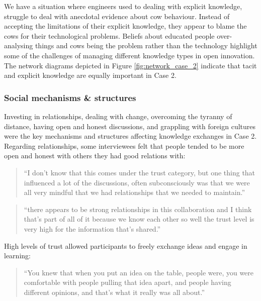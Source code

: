We have a situation where engineers used to dealing with explicit knowledge, struggle to deal with anecdotal evidence about cow behaviour. Instead of accepting the limitations of their explicit knowledge, they appear to blame the cows for their technological problems. Beliefs about educated people over-analysing things and cows being the problem rather than the technology highlight some of the challenges of managing different knowledge types in open innovation. The network diagrams depicted in Figure \ref{fig:network_case_2} indicate that tacit and explicit knowledge are equally important in Case 2. 
 
\subsubsection{Social mechanisms \& structures}

Investing in relationships, dealing with change, overcoming the tyranny of distance, having open and honest discussions, and grappling with foreign cultures were the key mechanisms and structures affecting knowledge exchanges in Case 2. Regarding relationships, some interviewees felt that people tended to be more open and honest with others they had good relations with:

\begin{quote}
\small
\enquote{I don't know that this comes under the trust category, but one thing that influenced a lot of the discussions, often subconsciously was that we were all very mindful that we had relationships that we needed to maintain.} \\
\end{quote}

\begin{quote}
\small
\enquote{there appears to be strong relationships in this collaboration and I think that's part of all of it because we know each other so well the trust level is very high for the information that's shared.} \\
\end{quote}

High levels of trust allowed participants to freely exchange ideas and engage in learning: 

\begin{quote}
\small
\enquote{You knew that when you put an idea on the table, people were, you were comfortable with people pulling that idea apart, and people having different opinions, and that’s what it really was all about.} \\
\end{quote}

